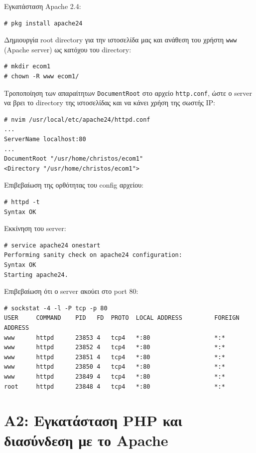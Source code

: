 \documentclass[12pt]{article}
\begin{document}
Εγκατάσταση Apache 2.4:

\begin{lstlisting}
# pkg install apache24
\end{lstlisting}

Δημιουργία root directory για την ιστοσελίδα μας και ανάθεση του χρήστη
\lstinline{www} (Apache server) ως κατόχου του directory:

\begin{lstlisting}
# mkdir ecom1
# chown -R www ecom1/
\end{lstlisting}

Τροποποίηση των απαραίτητων \lstinline{DocumentRoot} στο αρχείο
\lstinline{http.conf}, ώστε ο server να βρει το directory της ιστοσελίδας και
να κάνει χρήση της σωστής IP:

\begin{lstlisting}
# nvim /usr/local/etc/apache24/httpd.conf
...
ServerName localhost:80
...
DocumentRoot "/usr/home/christos/ecom1"
<Directory "/usr/home/christos/ecom1">
\end{lstlisting}

Επιβεβαίωση της ορθότητας του config αρχείου:

\begin{lstlisting}
# httpd -t
Syntax OK
\end{lstlisting}

Εκκίνηση του server:

\begin{lstlisting}
# service apache24 onestart
Performing sanity check on apache24 configuration:
Syntax OK
Starting apache24.
\end{lstlisting}

Επιβεβαίωση ότι ο server ακούει στο port 80:

\begin{lstlisting}
# sockstat -4 -l -P tcp -p 80
USER     COMMAND    PID   FD  PROTO  LOCAL ADDRESS         FOREIGN ADDRESS
www      httpd      23853 4   tcp4   *:80                  *:*
www      httpd      23852 4   tcp4   *:80                  *:*
www      httpd      23851 4   tcp4   *:80                  *:*
www      httpd      23850 4   tcp4   *:80                  *:*
www      httpd      23849 4   tcp4   *:80                  *:*
root     httpd      23848 4   tcp4   *:80                  *:*
\end{lstlisting}

\section{Α2: Εγκατάσταση PHP και διασύνδεση με το Apache}
\end{document}
